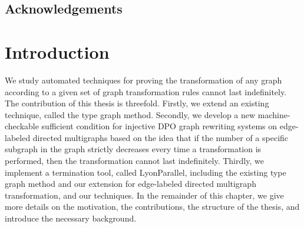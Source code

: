 \documentclass{report}
\begin{document}
  
  
  
 
\section*{Acknowledgements}

\newpage       

 
\tableofcontents  
\newpage      
  
\chapter{Introduction}
We study automated techniques for proving the transformation of any graph according to a given set of graph transformation rules cannot last indefinitely.
 The contribution of this thesis is threefold. 
 Firstly, we extend an existing technique, called the type graph method.
   Secondly, we develop a new machine-checkable sufficient condition 
   for injective DPO graph rewriting systems on edge-labeled directed multigraphs based on the idea that if the number of a specific subgraph in the graph strictly decreases every time a transformation is performed, then the transformation cannot last indefinitely.
    Thirdly, we implement a termination tool, called LyonParallel, including the existing 
    type graph method and our extension for edge-labeled directed multigraph transformation, and our techniques. In the remainder of this chapter, we give more details on the motivation, the contributions, the structure of the thesis, and introduce the necessary background.
\end{document}
